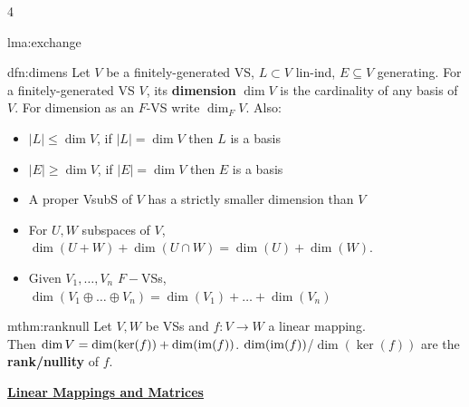 \documentclass[landscape, 8pt]{extarticle}
\begin{document}
\begin{multicols*}{4}
\begin{lma}{lma:exchange}{ }
			
		\end{lma}
		
		
		\begin{dfn}{dfn:dimens}{ }
			Let $V$ be a finitely-generated VS, $L \subset V$ lin-ind, $E \subseteq V$ generating.
			For a finitely-generated VS $V$, its \textbf{dimension} $\dim V$ is the cardinality of any basis of $V$. For dimension as an $F$-VS write $\dim_F V$. Also:		
			\begin{itemize}
				\item $\left|L\right| \le \dim V$, if $\left|L\right| = \dim V$ then $L$ is a basis
				\item $\left|E\right| \ge \dim V$, if $\left|E\right| = \dim V$ then $E$ is a basis
				\item A proper VsubS of $V$ has a strictly smaller dimension than $V$
				\item For $U, W$ subspaces of $V$, $\dim(U + W) + \dim (U \cap W) = \dim (U) + \dim (W).$
				\item Given $V_1, \dots, V_n$ $F-$VSs, $\dim (V_1 \oplus \dots \oplus V_n) = \dim (V_1) + \dots + \dim (V_n)$
			\end{itemize}
			
		\end{dfn}
		
		
		
		\begin{mthm}{mthm:ranknull}{ }
			Let $V, W$ be VSs and $f: V \to W$ a linear mapping. \\
			Then $\dim V = \dim (\ker(f)) + \dim(\operatorname{im}(f))$. $\dim(\operatorname{im}(f))$/$\dim (\ker (f))$ are the \textbf{rank/nullity} of $f$.
			
		\end{mthm}
		
		
	
	
	{\footnotesize \textbf{\underline{Linear Mappings and Matrices}}}
		
		
		

\end{multicols*}
\end{document}

